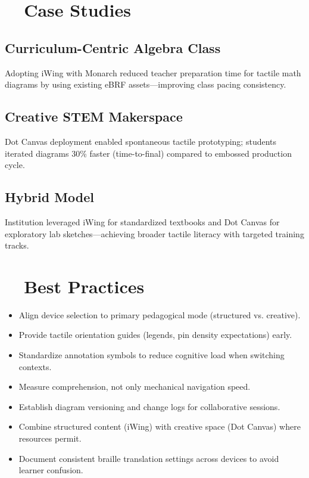 \section{~~Case Studies}
\label{sec:sr29-case-studies}
\subsection*{Curriculum-Centric Algebra Class}
Adopting iWing with Monarch reduced teacher preparation time for tactile math diagrams by using existing eBRF assets—improving class pacing consistency\supercite{paths_monarch}.

\subsection*{Creative STEM Makerspace}
Dot Canvas deployment enabled spontaneous tactile prototyping; students iterated diagrams 30\% faster (time-to-final) compared to embossed production cycle\supercite{ces_dotcanvas}.

\subsection*{Hybrid Model}
Institution leveraged iWing for standardized textbooks and Dot Canvas for exploratory lab sketches—achieving broader tactile literacy with targeted training tracks.

\section{~~Best Practices}
\label{sec:sr29-best-practices}
\begin{itemize}
	\item Align device selection to primary pedagogical mode (structured vs. creative).
	\item Provide tactile orientation guides (legends, pin density expectations) early.
	\item Standardize annotation symbols to reduce cognitive load when switching contexts.
	\item Measure comprehension, not only mechanical navigation speed.
	\item Establish diagram versioning and change logs for collaborative sessions.
	\item Combine structured content (iWing) with creative space (Dot Canvas) where resources permit.
	\item Document consistent braille translation settings across devices to avoid learner confusion.
\end{itemize}

